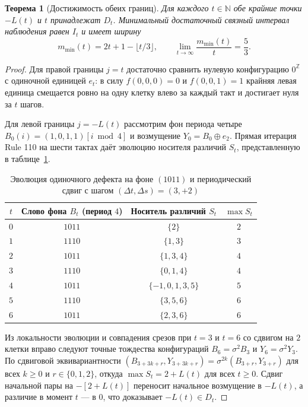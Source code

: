 \documentclass[11pt, a4paper]{article}
\newtheorem{theorem}{Теорема}[section]
\begin{document}
\begin{theorem}[Достижимость обеих границ]\label{thm:sharpness}
Для каждого $t \in \mathbb{N}$ обе крайние точки $-L(t)$ и $t$ принадлежат $D_t$. Минимальный достаточный связный интервал наблюдения равен $I_t$ и имеет ширину
\begin{equation}
m_{\min}(t) = 2t + 1 - \lfloor t/3 \rfloor, \qquad \lim_{t \to \infty} \frac{m_{\min}(t)}{t} = \frac{5}{3}.
\end{equation}
\end{theorem}

\begin{proof}
Для правой границы $j = t$ достаточно сравнить нулевую конфигурацию $0^{\mathbb{Z}}$ с одиночной единицей $e_t$: в силу $f(0, 0, 0) = 0$ и $f(0, 0, 1) = 1$ крайняя левая единица смещается ровно на одну клетку влево за каждый такт и достигает нуля за $t$ шагов.

Для левой границы $j = -L(t)$ рассмотрим фон периода четыре $B_0(i) = (1, 0, 1, 1)[i \bmod 4]$ и возмущение $Y_0 = B_0 \oplus e_2$. Прямая итерация Rule 110 на шести тактах даёт эволюцию носителя различий $S_t$, представленную в таблице~\ref{tab:period4_defect}.

\begin{table}[h]
\centering
\caption{Эволюция одиночного дефекта на фоне $(1011)$ и периодический сдвиг с шагом $(\Delta t, \Delta s) = (3, +2)$}
\label{tab:period4_defect}
\begin{tabular}{cccc}
\toprule
$t$ & Слово фона $B_t$ (период $4$) & Носитель различий $S_t$ & $\max S_t$ \\
\midrule
$0$ & $1011$ & $\{2\}$ & $2$ \\
$1$ & $1110$ & $\{1, 3\}$ & $3$ \\
$2$ & $1011$ & $\{1, 3, 4\}$ & $4$ \\
$3$ & $1110$ & $\{0, 1, 4\}$ & $4$ \\
$4$ & $1011$ & $\{-1, 0, 1, 3, 5\}$ & $5$ \\
$5$ & $1110$ & $\{3, 5, 6\}$ & $6$ \\
$6$ & $1011$ & $\{2, 3, 6\}$ & $6$ \\
\bottomrule
\end{tabular}
\end{table}

Из локальности эволюции и совпадения срезов при $t=3$ и $t=6$ со сдвигом на $2$ клетки вправо следуют точные тождества конфигураций $B_6 = \sigma^2 B_3$ и $Y_6 = \sigma^2 Y_3$. По сдвиговой эквивариантности $(B_{3+3k+r}, Y_{3+3k+r}) = \sigma^{2k}(B_{3+r}, Y_{3+r})$ для всех $k \ge 0$ и $r \in \{0, 1, 2\}$, откуда $\max S_t = 2 + L(t)$ для всех $t \ge 0$. Сдвиг начальной пары на $-[2 + L(t)]$ переносит начальное возмущение в $-L(t)$, а различие в момент $t$ — в $0$, что доказывает $-L(t) \in D_t$.
\end{proof}
\end{document}

